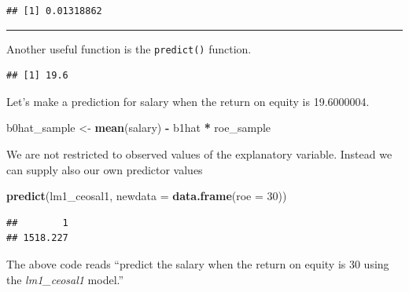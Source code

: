 \documentclass[]{book}
\newenvironment{Shaded}{\begin{snugshade}}{\end{snugshade}}
\newcommand{\CommentTok}[1]{\textcolor[rgb]{0.56,0.35,0.01}{\textit{#1}}}
\newcommand{\DataTypeTok}[1]{\textcolor[rgb]{0.13,0.29,0.53}{#1}}
\newcommand{\DecValTok}[1]{\textcolor[rgb]{0.00,0.00,0.81}{#1}}
\newcommand{\KeywordTok}[1]{\textcolor[rgb]{0.13,0.29,0.53}{\textbf{#1}}}
\newcommand{\NormalTok}[1]{#1}
\newcommand{\OperatorTok}[1]{\textcolor[rgb]{0.81,0.36,0.00}{\textbf{#1}}}
\newcommand{\StringTok}[1]{\textcolor[rgb]{0.31,0.60,0.02}{#1}}
\begin{document}
\begin{verbatim}
## [1] 0.01318862
\end{verbatim}

\begin{center}\rule{0.5\linewidth}{\linethickness}\end{center}

Another useful function is the \texttt{predict()} function.

\begin{Shaded}
\end{Shaded}

\begin{verbatim}
## [1] 19.6
\end{verbatim}

Let's make a prediction for salary when the return on equity is 19.6000004.

\begin{Shaded}
\begin{Highlighting}[]
\NormalTok{b0hat_sample <-}\StringTok{ }\KeywordTok{mean}\NormalTok{(salary) }\OperatorTok{-}\StringTok{ }\NormalTok{b1hat }\OperatorTok{*}\StringTok{ }\NormalTok{roe_sample }
\end{Highlighting}
\end{Shaded}

We are not restricted to observed values of the explanatory variable. Instead we can supply also our own predictor values

\begin{Shaded}
\begin{Highlighting}[]
\KeywordTok{predict}\NormalTok{(lm1_ceosal1, }\DataTypeTok{newdata =} \KeywordTok{data.frame}\NormalTok{(}\DataTypeTok{roe =} \DecValTok{30}\NormalTok{))}
\end{Highlighting}
\end{Shaded}

\begin{verbatim}
##        1 
## 1518.227
\end{verbatim}

The above code reads ``predict the salary when the return on equity is 30 using the \emph{lm1\_ceosal1} model.''
\end{document}

